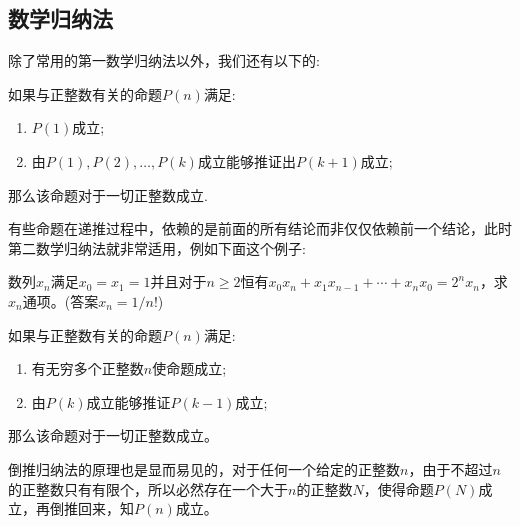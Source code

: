\subsection{数学归纳法}
\label{subsec:mathematical-induction}

除了常用的第一数学归纳法以外，我们还有以下的:
\begin{principle}[第二数学归纳法]
如果与正整数有关的命题$P(n)$满足:
  \begin{enumerate}
  \item $P(1)$成立;
  \item 由$P(1),P(2),\dots,P(k)$成立能够推证出$P(k+1)$成立;
  \end{enumerate}
那么该命题对于一切正整数成立.
\end{principle}
有些命题在递推过程中，依赖的是前面的所有结论而非仅仅依赖前一个结论，此时第二数学归纳法就非常适用，例如下面这个例子:

\begin{example}
  数列${x_n}$满足$x_0=x_1=1$并且对于$n\geqslant 2$恒有$x_0x_n+x_1x_{n-1}+\cdots+x_nx_0=2^nx_n$，求$x_n$通项。(答案$x_n=1/n!$)
\end{example}

\begin{principle}[倒推归纳法]
如果与正整数有关的命题$P(n)$满足:
  \begin{enumerate}
  \item 有无穷多个正整数$n$使命题成立;
  \item 由$P(k)$成立能够推证$P(k-1)$成立;
  \end{enumerate}
那么该命题对于一切正整数成立。
\end{principle}
倒推归纳法的原理也是显而易见的，对于任何一个给定的正整数$n$，由于不超过$n$的正整数只有有限个，所以必然存在一个大于$n$的正整数$N$，使得命题$P(N)$成立，再倒推回来，知$P(n)$成立。

